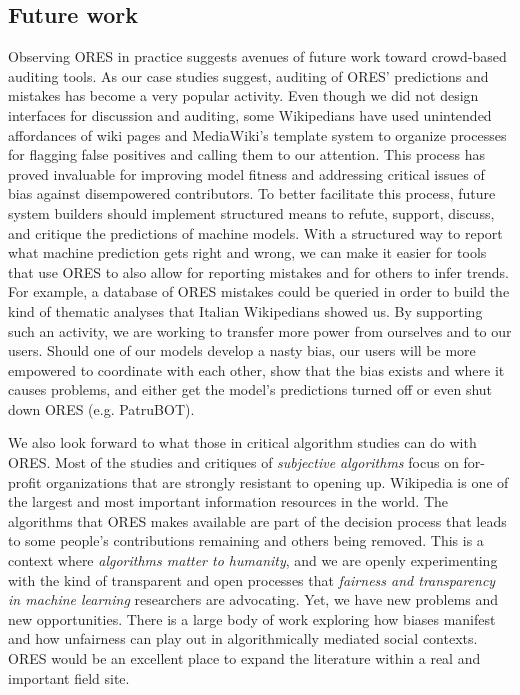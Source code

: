 \subsection{Future work}
Observing ORES in practice suggests avenues of future work toward crowd-based auditing tools.  As our case studies suggest, auditing of ORES' predictions and mistakes has become a very popular activity.  Even though we did not design interfaces for discussion and auditing, some Wikipedians have used unintended affordances of wiki pages and MediaWiki's template system to organize processes for flagging false positives and calling them to our attention.  This process has proved invaluable for improving model fitness and addressing critical issues of bias against disempowered contributors.  To better facilitate this process, future system builders should implement structured means to refute, support, discuss, and critique the predictions of machine models.  With a structured way to report what machine prediction gets right and wrong, we can make it easier for tools that use ORES to also allow for reporting mistakes and for others to infer trends.  For example, a database of ORES mistakes could be queried in order to build the kind of thematic analyses that Italian Wikipedians showed us.  By supporting such an activity, we are working to transfer more power from ourselves and to our users.  Should one of our models develop a nasty bias, our users will be more empowered to coordinate with each other, show that the bias exists and where it causes problems, and either get the model's predictions turned off or even shut down ORES (e.g. PatruBOT).

We also look forward to what those in critical algorithm studies can do with ORES. Most of the studies and critiques of \emph{subjective algorithms}\cite{tufekci2015algorithms} focus on for-profit organizations that are strongly resistant to opening up. Wikipedia is one of the largest and most important information resources in the world.  The algorithms that ORES makes available are part of the decision process that leads to some people's contributions remaining and others being removed.  This is a context where \emph{algorithms matter to humanity}, and we are openly experimenting with the kind of transparent and open processes that \emph{fairness and transparency in machine learning} researchers are advocating.  Yet, we have new problems and new opportunities.  There is a large body of work exploring how biases manifest and how unfairness can play out in algorithmically mediated social contexts.  ORES would be an excellent place to expand the literature within a real and important field site.

